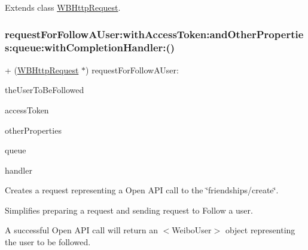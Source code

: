 Extends class \mbox{\hyperlink{interface_w_b_http_request_a869234d6cc01353dcfc8f0f47ad06f5c}{W\+B\+Http\+Request}}.

\mbox{\label{category_w_b_http_request_07_weibo_user_08_a857eebccc3b26b8d7c5bbc38a3ae2627}} 
\subsubsection{\texorpdfstring{request\+For\+Follow\+A\+User\+:with\+Access\+Token\+:and\+Other\+Properties\+:queue\+:with\+Completion\+Handler\+:()}{requestForFollowAUser:withAccessToken:andOtherProperties:queue:withCompletionHandler:()}\hspace{0.1cm}{\footnotesize\ttfamily [1/3]}}
{\footnotesize\ttfamily + (\mbox{\hyperlink{interface_w_b_http_request}{W\+B\+Http\+Request}} $\ast$) request\+For\+Follow\+A\+User\+: \begin{DoxyParamCaption}\item[{(N\+S\+String $\ast$)}]{the\+User\+To\+Be\+Followed }\item[{withAccessToken:(N\+S\+String $\ast$)}]{access\+Token }\item[{andOtherProperties:(N\+S\+Dictionary $\ast$)}]{other\+Properties }\item[{queue:(N\+S\+Operation\+Queue $\ast$)}]{queue }\item[{withCompletionHandler:(W\+B\+Request\+Handler)}]{handler }\end{DoxyParamCaption}}

Creates a request representing a Open A\+PI call to the \char`\"{}friendships/create\char`\"{}.

Simplifies preparing a request and sending request to Follow a user.

A successful Open A\+PI call will return an $<$\+Weibo\+User$>$ object representing the user to be followed.

